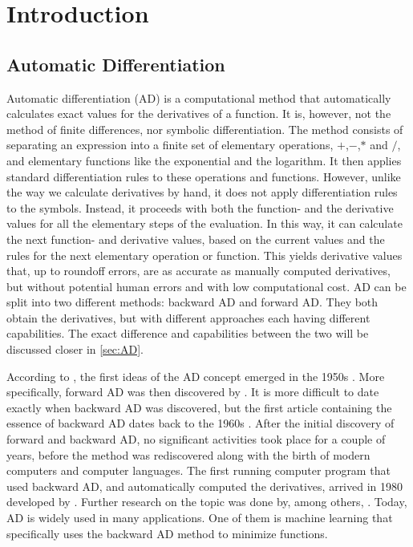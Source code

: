 \chapter{Introduction}
\section{Automatic Differentiation}
Automatic differentiation (AD) is a computational method that automatically calculates exact values for the derivatives of a function. It is, however, not the method of finite differences, nor symbolic differentiation. The method consists of separating an expression into a finite set of elementary operations, $+$,$-$,$*$ and $/$, and elementary functions like the exponential and the logarithm. It then applies standard differentiation rules to these operations and functions. However, unlike the way we calculate derivatives by hand, it does not apply differentiation rules to the symbols. Instead, it proceeds with both the function- and the derivative values for all the elementary steps of the evaluation. In this way, it can calculate the next function- and derivative values, based on the current values and the rules for the next elementary operation or function. This yields derivative values that, up to roundoff errors, are as accurate as manually computed derivatives, but without potential human errors and with low computational cost. AD can be split into two different methods: backward AD and forward AD. They both obtain the derivatives, but with different approaches each having different capabilities. The exact difference and capabilities between the two will be discussed closer in \autoref{sec:AD}. 

According to \emph{\cite{SurveyAD}}, the first ideas of the AD concept emerged in the 1950s \emph{\citep{nolan1953analytical, beda1959programs}}. More specifically, forward AD was then discovered by \emph{\citet{wengert1964simple}}. It is more difficult to date exactly when backward AD was discovered, but the first article containing the essence of backward AD dates back to the 1960s \emph{\citep{boltyanskii1960theory}}. After the initial discovery of forward and backward AD, no significant activities took place for a couple of years, before the method was rediscovered along with the birth of modern computers and computer languages. The first running computer program that used backward AD, and automatically computed the derivatives, arrived in 1980 developed by \emph{\citet{speelpenning1980compiling}}. Further research on the topic was done by, among others, \emph{\citet{griewank1989automatic}}. Today, AD is widely used in many applications. One of them is machine learning that specifically uses the backward AD method to minimize functions. 

